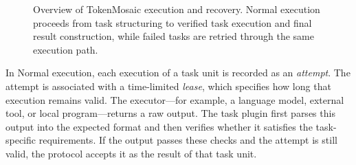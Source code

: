 \documentclass{article}
\theoremstyle{plain}
\begin{document}
\begin{figure}[!h]
{%
}

\caption{
Overview of TokenMosaic execution and recovery. Normal execution proceeds from task structuring to verified task execution and final result construction, while failed tasks are retried through the same execution path.
}
\label{fig:protocol-and-recovery-overview}
\end{figure}

In Normal execution, each execution of a task unit is recorded as an \emph{attempt}. The attempt is associated with a time-limited \emph{lease}, which specifies how long that execution remains valid. The executor---for example, a language model, external tool, or local program---returns a raw output. The task plugin first parses this output into the expected format and then verifies whether it satisfies the task-specific requirements. If the output passes these checks and the attempt is still valid, the protocol accepts it as the result of that task unit.
\end{document}
